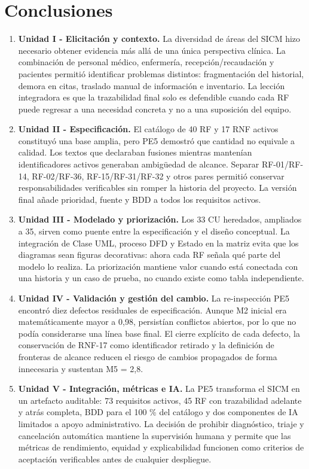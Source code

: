 \documentclass[11pt,a4paper]{article}
\begin{document}
	\section{Conclusiones}
	\begin{enumerate}
		\item \textbf{Unidad I - Elicitación y contexto.} La diversidad de áreas del SICM hizo necesario obtener evidencia más allá de una única perspectiva clínica. La combinación de personal médico, enfermería, recepción/recaudación y pacientes permitió identificar problemas distintos: fragmentación del historial, demora en citas, traslado manual de información e inventario. La lección integradora es que la trazabilidad final solo es defendible cuando cada RF puede regresar a una necesidad concreta y no a una suposición del equipo.
		
		\item \textbf{Unidad II - Especificación.} El catálogo de 40 RF y 17 RNF activos constituyó una base amplia, pero PE5 demostró que cantidad no equivale a calidad. Los textos que declaraban fusiones mientras mantenían identificadores activos generaban ambigüedad de alcance. Separar RF-01/RF-14, RF-02/RF-36, RF-15/RF-31/RF-32 y otros pares permitió conservar responsabilidades verificables sin romper la historia del proyecto. La versión final añade prioridad, fuente y BDD a todos los requisitos activos.
		
		\item \textbf{Unidad III - Modelado y priorización.} Los 33 CU heredados, ampliados a 35, sirven como puente entre la especificación y el diseño conceptual. La integración de Clase UML, proceso DFD y Estado en la matriz evita que los diagramas sean figuras decorativas: ahora cada RF señala qué parte del modelo lo realiza. La priorización mantiene valor cuando está conectada con una historia y un caso de prueba, no cuando existe como tabla independiente.
		
		\item \textbf{Unidad IV - Validación y gestión del cambio.} La re-inspección PE5 encontró diez defectos residuales de especificación. Aunque M2 inicial era matemáticamente mayor a 0,98, persistían conflictos abiertos, por lo que no podía considerarse una línea base final. El cierre explícito de cada defecto, la conservación de RNF-17 como identificador retirado y la definición de fronteras de alcance reducen el riesgo de cambios propagados de forma innecesaria y sustentan M5 = 2,8.
		
		\item \textbf{Unidad V - Integración, métricas e IA.} La PE5 transforma el SICM en un artefacto auditable: 73 requisitos activos, 45 RF con trazabilidad adelante y atrás completa, BDD para el 100 \% del catálogo y dos componentes de IA limitados a apoyo administrativo. La decisión de prohibir diagnóstico, triaje y cancelación automática mantiene la supervisión humana y permite que las métricas de rendimiento, equidad y explicabilidad funcionen como criterios de aceptación verificables antes de cualquier despliegue.
	\end{enumerate}
	\clearpage
\end{document}
